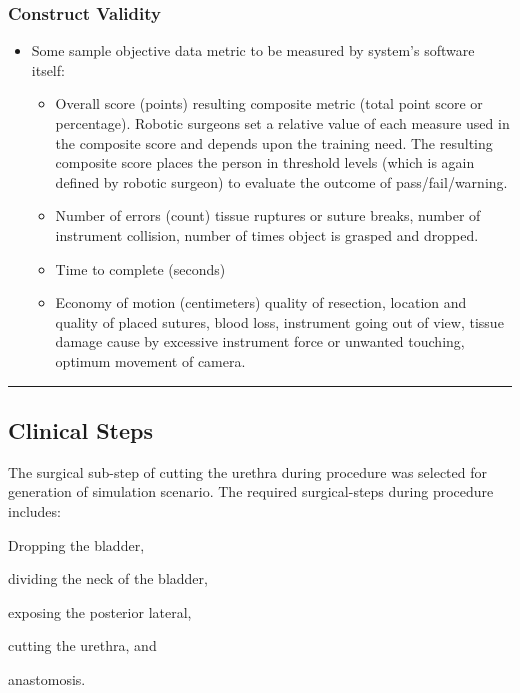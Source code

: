 \subsubsection{Construct Validity}
\label{sssec:construct_validity}
\begin{itemize}
  \item Some sample objective data metric to be measured by system's software itself:
  \begin{itemize}
    \item Overall score (points) \eg resulting composite metric (total point score or percentage). Robotic surgeons set a relative value of each measure used in the composite score and depends upon the training need. The resulting composite score places the person in threshold levels (which is again defined by robotic surgeon) to evaluate the outcome of pass/fail/warning.
    \item Number of errors (count) \eg tissue ruptures or suture breaks, number of instrument collision, number of times object is grasped and dropped.
    \item Time to complete (seconds)
    \item Economy of motion (centimeters) \eg quality of resection, location and quality of placed sutures, blood loss, instrument going out of view, tissue damage cause by excessive instrument force or unwanted touching, optimum movement of camera.
  \end{itemize}
\end{itemize}




\hrule%

\subsection{Clinical Steps}
\label{ssec:clinical}
The surgical sub-step of cutting the urethra during  procedure was selected for generation of simulation scenario. The required surgical-steps during  procedure includes:
\begin{enumerate*}[\em i\em)]
  \item Dropping the bladder,
  \item dividing the neck of the bladder,
  \item exposing the posterior lateral,
  \item cutting the urethra, and
  \item anastomosis.
\end{enumerate*}

